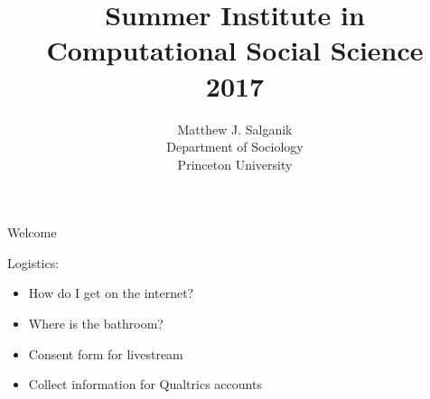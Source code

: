 \documentclass{beamer}
\title[]{{\large Summer Institute in Computational Social Science\\2017}}
\author[]{Matthew J. Salganik\\Department of Sociology\\Princeton University}
\date[]{01-01-Welcome and logistics
\vfill
\begin{flushright}
\vspace{0.6in}
\texttt{[image: figures/cc.png]}
\end{flushright}
}
\begin{document}
\frame{\titlepage}
\begin{frame}

\begin{center}
\Large{Welcome}
\end{center}

\end{frame}
\begin{frame}

Logistics:
\pause
\begin{itemize}
\item How do I get on the internet?
\pause
\item Where is the bathroom?
\pause
\item Consent form for livestream
\pause
\item Collect information for Qualtrics accounts
\end{itemize}

\end{frame}
\end{document}
